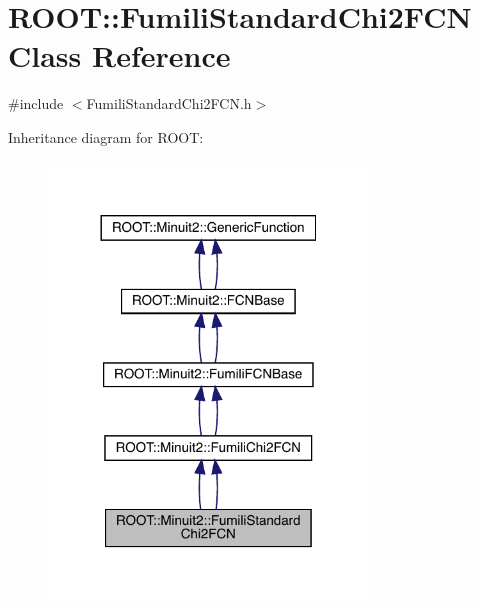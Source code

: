 \hypertarget{classROOT_1_1Minuit2_1_1FumiliStandardChi2FCN}{}\section{R\+O\+OT\+:\+:Fumili\+Standard\+Chi2\+F\+CN Class Reference}
\label{classROOT_1_1Minuit2_1_1FumiliStandardChi2FCN}


{\ttfamily \#include $<$Fumili\+Standard\+Chi2\+F\+C\+N.\+h$>$}



Inheritance diagram for R\+O\+OT\+:\nopagebreak
\begin{figure}[H]
\begin{center}
\leavevmode
\includegraphics[width=240pt]{d4/d3d/classROOT_1_1Minuit2_1_1FumiliStandardChi2FCN__inherit__graph}
\end{center}
\end{figure}


